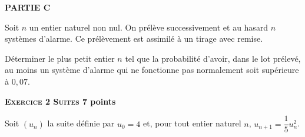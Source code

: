 \documentclass[11pt]{article}
\begin{document}
\medskip

\textbf{PARTIE C}

\medskip

Soit $n$ un entier naturel non nul. On prélève successivement et au hasard $n$ systèmes d'alarme. Ce prélèvement est assimilé à un tirage avec remise.

Déterminer le plus petit entier $n$ tel que la probabilité d'avoir, dans le lot prélevé, au moins un système d'alarme qui ne fonctionne pas normalement soit supérieure à $0,07$.

\bigskip

\textbf{\textsc{Exercice 2 Suites} \hfill 7 points}

\medskip

Soit $\left(u_n\right)$ la suite définie par $u_0 = 4$ et, pour tout entier naturel $n$,\: $u_{n+1} = \dfrac15 u_n^2$.

\medskip
\end{document}
